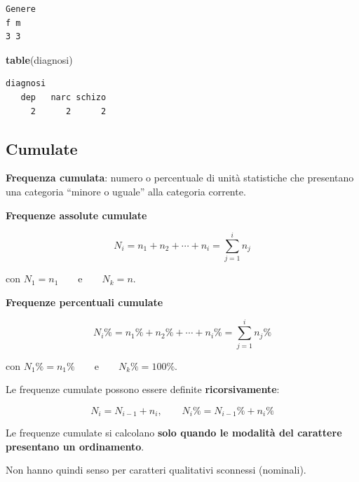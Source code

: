 \documentclass[
  a4paper,
  DIV=11,
  numbers=noendperiod]{scrreprt}
\newenvironment{Shaded}{\begin{snugshade}}{\end{snugshade}}
\newcommand{\FunctionTok}[1]{\textcolor[rgb]{0.13,0.29,0.53}{\textbf{#1}}}
\newcommand{\NormalTok}[1]{#1}
\begin{document}
\begin{verbatim}
Genere
f m 
3 3 
\end{verbatim}

\begin{Shaded}
\begin{Highlighting}[]
\FunctionTok{table}\NormalTok{(diagnosi)}
\end{Highlighting}
\end{Shaded}

\begin{verbatim}
diagnosi
   dep   narc schizo 
     2      2      2 
\end{verbatim}

\subsection{Cumulate}\label{cumulate}

\textbf{Frequenza cumulata}: numero o percentuale di unità statistiche
che presentano una categoria ``minore o uguale'' alla categoria
corrente.

\textbf{Frequenze assolute cumulate}

\[N_i = n_1 + n_2 + \cdots + n_i
    = \sum_{j=1}^{i} n_j\]

con \(N_1 = n_1 \qquad \text{e} \qquad N_k = n.\)

\textbf{Frequenze percentuali cumulate}

\[
N_i\% = n_1\% + n_2\% + \cdots + n_i\%
       = \sum_{j=1}^{i} n_j\%
\]

con \(N_1\% = n_1\% \qquad \text{e} \qquad N_k\% = 100\%.\)

Le frequenze cumulate possono essere definite \textbf{ricorsivamente}:

\[N_i = N_{i-1} + n_i, \qquad N_i\% = N_{i-1}\% + n_i\%\]

\begin{tcolorbox}[enhanced jigsaw, toprule=.15mm, left=2mm, leftrule=.75mm, breakable, coltitle=black, title={Attenzione}, bottomtitle=1mm, opacitybacktitle=0.6, toptitle=1mm, titlerule=0mm, bottomrule=.15mm, colframe=quarto-callout-caution-color-frame, arc=.35mm, rightrule=.15mm, opacityback=0, colbacktitle=quarto-callout-caution-color!10!white, colback=white]

Le frequenze cumulate si calcolano \textbf{solo quando le modalità del
carattere presentano un ordinamento}.

Non hanno quindi senso per caratteri qualitativi sconnessi (nominali).

\end{tcolorbox}
\end{document}
